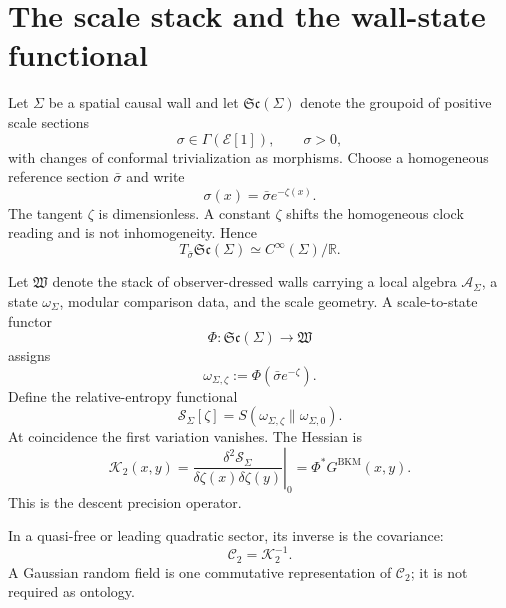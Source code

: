 \documentclass[11pt]{article}
\numberwithin{equation}{section}
\newcommand{\BKM}{\mathrm{BKM}}
\newcommand{\Sc}{\mathfrak{Sc}}
\newcommand{\Wall}{\mathfrak W}
\begin{document}
\section{The scale stack and the wall-state functional}

Let $\Sigma$ be a spatial causal wall and let $\Sc(\Sigma)$ denote the groupoid of positive scale sections
\begin{equation}
\sigma\in\Gamma(\mathcal E[1]),\qquad \sigma>0,
\end{equation}
with changes of conformal trivialization as morphisms. Choose a homogeneous reference section $\bar\sigma$ and write
\begin{equation}
\boxed{\sigma(x)=\bar\sigma e^{-\zeta(x)}.}
\end{equation}
The tangent $\zeta$ is dimensionless. A constant $\zeta$ shifts the homogeneous clock reading and is not inhomogeneity. Hence
\begin{equation}
T_{\bar\sigma}\Sc(\Sigma)\simeq C^\infty(\Sigma)/\mathbb R.
\end{equation}

Let $\Wall$ denote the stack of observer-dressed walls carrying a local algebra $\mathcal A_\Sigma$, a state $\omega_\Sigma$, modular comparison data, and the scale geometry. A scale-to-state functor
\begin{equation}
\Phi:\Sc(\Sigma)\longrightarrow\Wall
\end{equation}
assigns
\begin{equation}
\omega_{\Sigma,\zeta}:=\Phi(\bar\sigma e^{-\zeta}).
\end{equation}
Define the relative-entropy functional
\begin{equation}
\boxed{\mathscr S_\Sigma[\zeta]=S(\omega_{\Sigma,\zeta}\|\omega_{\Sigma,0}).}
\end{equation}
At coincidence the first variation vanishes. The Hessian is
\begin{equation}
\boxed{
\mathcal K_2(x,y)=\left.\frac{\delta^2\mathscr S_\Sigma}{\delta\zeta(x)\delta\zeta(y)}\right|_{0}=\Phi^*G^{\BKM}(x,y).}
\end{equation}
This is the descent precision operator.

In a quasi-free or leading quadratic sector, its inverse is the covariance:
\begin{equation}
\mathcal C_2=\mathcal K_2^{-1}.
\end{equation}
A Gaussian random field is one commutative representation of $\mathcal C_2$; it is not required as ontology.
\end{document}

